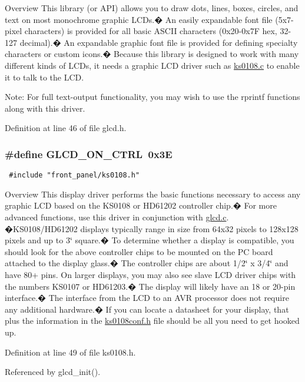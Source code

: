  \begin{Desc}
\item[Overview]This library (or API) allows you to draw dots, lines, boxes, circles, and text on most monochrome graphic LCDs.� An easily expandable font file (5x7-pixel characters) is provided for all basic ASCII characters (0x20-0x7F hex, 32-127 decimal).� An expandable graphic font file is provided for defining specialty characters or custom icons.� Because this library is designed to work with many different kinds of LCDs, it needs a graphic LCD driver such as \hyperlink{ks0108_8c}{ks0108.c} to enable it to talk to the LCD.\end{Desc}
\begin{Desc}
\item[Note:]For full text-output functionality, you may wish to use the rprintf functions along with this driver. \end{Desc}


Definition at line 46 of file glcd.h.\hypertarget{group__front__panel__group_gc713332b9d7760dbb16cc1e670405c5d}{
\subsubsection[{GLCD\_\-ON\_\-CTRL}]{\setlength{\rightskip}{0pt plus 5cm}\#define GLCD\_\-ON\_\-CTRL~0x3E}}
\label{group__front__panel__group_gc713332b9d7760dbb16cc1e670405c5d}




\begin{Code}\begin{verbatim} #include "front_panel/ks0108.h" 
\end{verbatim}
\end{Code}

 \begin{Desc}
\item[Overview]This display driver performs the basic functions necessary to access any graphic LCD based on the KS0108 or HD61202 controller chip.� For more advanced functions, use this driver in conjunction with \hyperlink{glcd_8c}{glcd.c}. �KS0108/HD61202 displays typically range in size from 64x32 pixels to 128x128 pixels and up to 3\char`\"{} square.� To determine whether a display is compatible, you should look for the above controller chips to be mounted on the PC board attached to the display glass.� The controller chips are about 1/2\char`\"{} x 3/4\char`\"{} and have 80+ pins. On larger displays, you may also see slave LCD driver chips with the numbers KS0107 or HD61203.� The display will likely have an 18 or 20-pin interface.� The interface from the LCD to an AVR processor does not require any additional hardware.� If you can locate a datasheet for your display, that plus the information in the \hyperlink{ks0108conf_8h}{ks0108conf.h} file should be all you need to get hooked up. \end{Desc}


Definition at line 49 of file ks0108.h.

Referenced by glcd\_\-init().